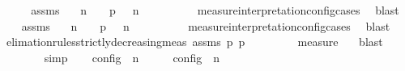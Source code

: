 \begin{isabellebody}
%
\isadelimproof
%
\endisadelimproof
%
\isatagproof
{}\isamarkupfalse%
\ {\isacharminus}\isanewline
\ \ \isamarkupfalse%
\ assms\ \isamarkupfalse%
\ {\isasymGamma}\ n\ {\isasymPsi}\ {\isasymPhi}\ \ p{}{\isacharcolon}{\isacartoucheopen}{\isasymS}\ {\isacharequal}\ {\isacharparenleft}{\isasymGamma}\ n\ {\isasymturnstile}\ {\isasymPsi}\ {\isasymtriangleright}\ {\isasymPhi}\isanewline
\ \ \ \ \isamarkupfalse%
\ measure{\isacharunderscore}interpretation{\isacharunderscore}config{\isachardot}cases\ \isamarkupfalse%
\ blast\isanewline
\ \ \isamarkupfalse%
\ assms\ \isamarkupfalse%
\ {\isasymGamma}\ n\ {\isasymPsi}\ {\isasymPhi}\ \ p{}{\isacharcolon}{\isacartoucheopen}{\isasymS}\ {\isacharequal}\ {\isacharparenleft}{\isasymGamma}\ n\ {\isasymturnstile}\ {\isasymPsi}\ {\isasymtriangleright}\ {\isasymPhi}\isanewline
\ \ \ \ \isamarkupfalse%
\ measure{\isacharunderscore}interpretation{\isacharunderscore}config{\isachardot}cases\ \isamarkupfalse%
\ blast\isanewline
\ \ \isamarkupfalse%
\ elimation{\isacharunderscore}rules{\isacharunderscore}strictly{\isacharunderscore}decreasing{\isacharunderscore}meas\ assms\ p{}\ p{}\isanewline
\ \ \ \ \isamarkupfalse%
\ {\isacartoucheopen}{\isacharparenleft}{\isasymPsi}\ {\isasymPsi}\ {\isasymin}\ measure\ {\isasymmu}{\isacartoucheclose}\ \isamarkupfalse%
\ blast\isanewline
\ \ \isamarkupfalse%
\ {\isacartoucheopen}{\isasymmu}\ {\isasymPsi}\ {\isacharless}\ {\isasymmu}\ {\isasymPsi}\ \isamarkupfalse%
\ simp\isanewline
\ \ \isamarkupfalse%
\ {\isacartoucheopen}{\isasymmu}\isactrlsub c\isactrlsub o\isactrlsub n\isactrlsub f\isactrlsub i\isactrlsub g\ {\isacharparenleft}{\isasymGamma}\ n\ {\isasymturnstile}\ {\isasymPsi}\ {\isasymtriangleright}\ {\isasymPhi}\ {\isacharless}\ {\isasymmu}\isactrlsub c\isactrlsub o\isactrlsub n\isactrlsub f\isactrlsub i\isactrlsub g\ {\isacharparenleft}{\isasymGamma}\ n\ {\isasymturnstile}\ {\isasymPsi}\ {\isasymtriangleright}\ {\isasymPhi}\ \isamarkupfalse%

\end{isabellebody}
